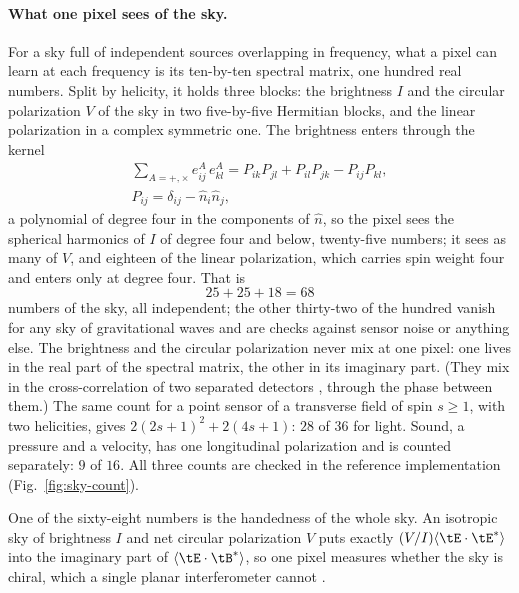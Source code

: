 \paragraph{What one pixel sees of the sky.} For a sky full of independent
sources overlapping in frequency, what a pixel can learn at each frequency is
its ten-by-ten spectral matrix, one hundred real numbers. Split by helicity, it
holds three blocks: the brightness $I$ and the circular polarization $V$ of the
sky in two five-by-five Hermitian blocks, and the linear polarization in a
complex symmetric one. The brightness enters through the kernel
\begin{equation}\label{eq:pixel-kernel}
\begin{gathered}
\sum_{A=+,\times} e^{A}_{ij}\, e^{A}_{kl}
= P_{ik}P_{jl} + P_{il}P_{jk} - P_{ij}P_{kl},\\
P_{ij} = \delta_{ij} - \hat n_i \hat n_j ,
\end{gathered}
\end{equation}
a polynomial of degree four in the components of $\hat n$, so the pixel sees the
spherical harmonics of $I$ of degree four and below, twenty-five numbers; it
sees as many of $V$, and eighteen of the linear polarization, which carries spin
weight four and enters only at degree four. That is
\begin{equation}\label{eq:sky-count}
25 + 25 + 18 = 68
\end{equation}
numbers of the sky, all independent; the other thirty-two of the hundred vanish
for any sky of gravitational waves and are checks against sensor noise or
anything else. The brightness and the circular polarization never mix at one
pixel: one lives in the real part of the spectral matrix, the other in its
imaginary part. (They mix in the cross-correlation of two separated detectors
\cite{AllenOttewill1997,SetoCooray2004}, through the phase between them.) The
same count for a point sensor of a transverse field of spin $s \ge 1$, with two
helicities, gives $2(2s+1)^2 + 2(4s+1)$: $28$ of $36$ for light. Sound, a
pressure and a velocity, has one longitudinal polarization and is counted
separately: $9$ of $16$. All
three counts are checked in the reference implementation
(Fig.~\ref{fig:sky-count}).

One of the sixty-eight numbers is the handedness of the whole sky. An isotropic
sky of brightness $I$ and net circular polarization $V$ puts exactly
$(V/I)\langle\tE\cdot\tE^*\rangle$ into the imaginary part of
$\langle\tE\cdot\tB^*\rangle$, so one pixel measures
whether the sky is chiral, which a single planar interferometer cannot
\cite{SetoTaruya2007}.

